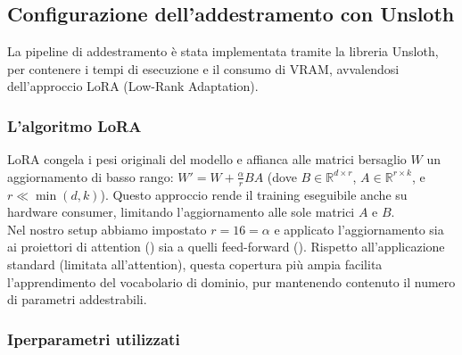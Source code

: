 
\newpage

\subsection{Configurazione dell'addestramento con Unsloth}\label{subsec:unsloth}
    La pipeline di addestramento è stata implementata tramite la libreria Unsloth, per contenere i tempi di esecuzione e il consumo di VRAM, avvalendosi dell'approccio LoRA (Low-Rank Adaptation).

    \subsubsection{L'algoritmo LoRA}
        LoRA congela i pesi originali del modello e affianca alle matrici bersaglio $W$ un aggiornamento di basso rango: $W' = W + \frac{\alpha}{r}BA$ (dove $B \in \mathbb{R}^{d \times r}$, $A \in \mathbb{R}^{r \times k}$, e $r \ll \min(d,k)$). Questo approccio rende il training eseguibile anche su hardware consumer, limitando l'aggiornamento alle sole matrici $A$ e $B$.\\
        Nel nostro setup abbiamo impostato $r = 16 = \alpha$ e applicato l'aggiornamento sia ai proiettori di attention () sia a quelli feed-forward (). Rispetto all'applicazione standard (limitata all'attention), questa copertura più ampia facilita l'apprendimento del vocabolario di dominio, pur mantenendo contenuto il numero di parametri addestrabili.

\subsubsection{Iperparametri utilizzati}\label{subsec:hyperparams}

